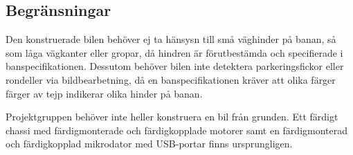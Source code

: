 \documentclass[projektplan/plan.tex]{subfiles}
\begin{document}
\noindent


\subsection{Begränsningar}
Den konstruerade bilen behöver ej ta hänsysn till små väghinder på banan, så
som låga vägkanter eller gropar, då hindren är förutbestämda och specifierade
i banspecifikationen. Dessutom behöver bilen inte detektera parkeringsfickor
eller rondeller via bildbearbetning, då en banspecifikationen kräver att olika
färger färger av tejp indikerar olika hinder på banan.

Projektgruppen behöver inte heller konstruera en bil från grunden. Ett färdigt
chassi med färdigmonterade och färdigkopplade motorer samt en färdigmonterad
och färdigkopplad mikrodator med USB-portar finns ursprungligen.
\end{document}
